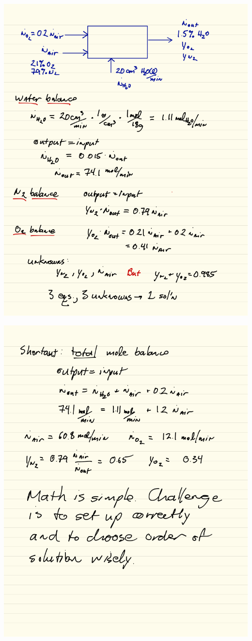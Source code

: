 \documentclass[11pt]{article}
\begin{document}
\includegraphics[width=.9\linewidth]{./figs/Diff-balance3.png}

\includegraphics[width=.9\linewidth]{./figs/Diff-balance4.png}
\end{document}
